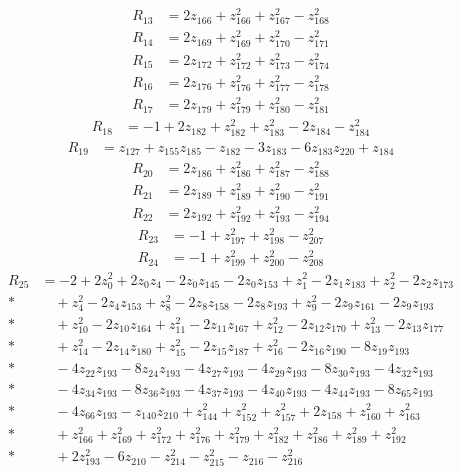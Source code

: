 \begin{align*}
R_{13}&=2z_{166}+z_{166}^{2}+z_{167}^{2}-z_{168}^{2}
\end{align*}
\begin{align*}
R_{14}&=2z_{169}+z_{169}^{2}+z_{170}^{2}-z_{171}^{2}
\end{align*}
\begin{align*}
R_{15}&=2z_{172}+z_{172}^{2}+z_{173}^{2}-z_{174}^{2}
\end{align*}
\begin{align*}
R_{16}&=2z_{176}+z_{176}^{2}+z_{177}^{2}-z_{178}^{2}
\end{align*}
\begin{align*}
R_{17}&=2z_{179}+z_{179}^{2}+z_{180}^{2}-z_{181}^{2}
\end{align*}
\begin{align*}
R_{18}&=-1+2z_{182}+z_{182}^{2}+z_{183}^{2}-2z_{184}-z_{184}^{2}
\end{align*}
\begin{align*}
R_{19}&=z_{127}+z_{155} z_{185}-z_{182}-3z_{183}-6z_{183} z_{220}+z_{184}
\end{align*}
\begin{align*}
R_{20}&=2z_{186}+z_{186}^{2}+z_{187}^{2}-z_{188}^{2}
\end{align*}
\begin{align*}
R_{21}&=2z_{189}+z_{189}^{2}+z_{190}^{2}-z_{191}^{2}
\end{align*}
\begin{align*}
R_{22}&=2z_{192}+z_{192}^{2}+z_{193}^{2}-z_{194}^{2}
\end{align*}
\begin{align*}
R_{23}&=-1+z_{197}^{2}+z_{198}^{2}-z_{207}^{2}
\end{align*}
\begin{align*}
R_{24}&=-1+z_{199}^{2}+z_{200}^{2}-z_{208}^{2}
\end{align*}
\begin{align*}
R_{25}&=-2+2z_{0}^{2}+2z_{0} z_{4}-2z_{0} z_{145}-2z_{0} z_{153}+z_{1}^{2}-2z_{1} z_{183}+z_{2}^{2}-2z_{2} z_{173}\\*
&\quad{}+z_{4}^{2}-2z_{4} z_{153}+z_{8}^{2}-2z_{8} z_{158}-2z_{8} z_{193}+z_{9}^{2}-2z_{9} z_{161}-2z_{9} z_{193}\\*
&\quad{}+z_{10}^{2}-2z_{10} z_{164}+z_{11}^{2}-2z_{11} z_{167}+z_{12}^{2}-2z_{12} z_{170}+z_{13}^{2}-2z_{13} z_{177}\\*
&\quad{}+z_{14}^{2}-2z_{14} z_{180}+z_{15}^{2}-2z_{15} z_{187}+z_{16}^{2}-2z_{16} z_{190}-8z_{19} z_{193}\\*
&\quad{}-4z_{22} z_{193}-8z_{24} z_{193}-4z_{27} z_{193}-4z_{29} z_{193}-8z_{30} z_{193}-4z_{32} z_{193}\\*
&\quad{}-4z_{34} z_{193}-8z_{36} z_{193}-4z_{37} z_{193}-4z_{40} z_{193}-4z_{44} z_{193}-8z_{65} z_{193}\\*
&\quad{}-4z_{66} z_{193}-z_{140} z_{210}+z_{144}^{2}+z_{152}^{2}+z_{157}^{2}+2z_{158}+z_{160}^{2}+z_{163}^{2}\\*
&\quad{}+z_{166}^{2}+z_{169}^{2}+z_{172}^{2}+z_{176}^{2}+z_{179}^{2}+z_{182}^{2}+z_{186}^{2}+z_{189}^{2}+z_{192}^{2}\\*
&\quad{}+2z_{193}^{2}-6z_{210}-z_{214}^{2}-z_{215}^{2}-z_{216}-z_{216}^{2}
\end{align*}

